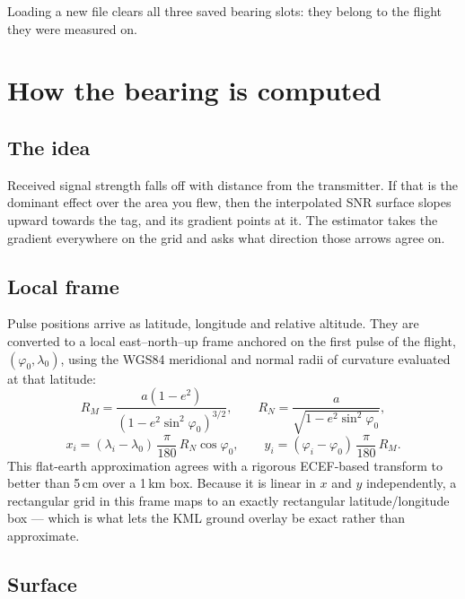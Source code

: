 \documentclass[11pt,a4paper]{article}
\begin{document}
\noindent Loading a new file clears all three saved bearing slots: they belong
to the flight they were measured on.

\section{How the bearing is computed}
\label{sec:theory}

\subsection{The idea}

Received signal strength falls off with distance from the transmitter. If that
is the dominant effect over the area you flew, then the interpolated SNR surface
slopes upward towards the tag, and its gradient points at it. The estimator
takes the gradient everywhere on the grid and asks what direction those arrows
agree on.

\subsection{Local frame}

Pulse positions arrive as latitude, longitude and relative altitude. They are
converted to a local east--north--up frame anchored on the first pulse of the
flight, $(\varphi_0,\lambda_0)$, using the WGS84 meridional and normal radii of
curvature evaluated at that latitude:
%
\begin{equation}
R_M = \frac{a(1-e^2)}{\left(1-e^2\sin^2\varphi_0\right)^{3/2}},
\qquad
R_N = \frac{a}{\sqrt{1-e^2\sin^2\varphi_0}},
\end{equation}
%
\begin{equation}
x_i = (\lambda_i-\lambda_0)\,\frac{\pi}{180}\,R_N\cos\varphi_0,
\qquad
y_i = (\varphi_i-\varphi_0)\,\frac{\pi}{180}\,R_M .
\end{equation}
%
This flat-earth approximation agrees with a rigorous ECEF-based transform to
better than 5\,cm over a 1\,km box. Because it is
linear in $x$ and $y$ independently, a rectangular grid in this frame maps to an
exactly rectangular latitude/longitude box --- which is what lets the KML ground
overlay be exact rather than approximate.

\subsection{Surface}
\end{document}
